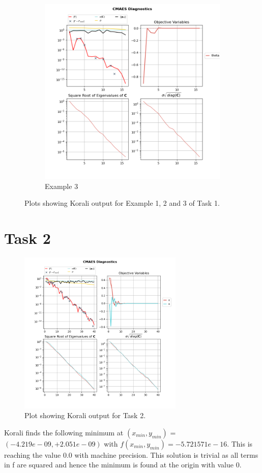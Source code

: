 \documentclass{article}
\begin{document}
\begin{figure}[ht]
\begin{subfigure}[b]{0.5\linewidth}
        \end{subfigure}
        \begin{subfigure}[b]{0.5\linewidth}
            \centering
            \includegraphics[width=0.95\linewidth]{img/example_1.png}
            \caption{Example 3}
        \end{subfigure}
        \caption{Plots showing Korali output for Example 1, 2 and 3 of Task 1.}
    \end{figure}

    \section{Task 2}
    \begin{figure}
        \centering
        \includegraphics[width=0.7\textwidth]{img/task2.png}
        \caption{Plot showing Korali output for Task 2.}
    \end{figure}
    Korali finds the following minimum at $(x_{min}, y_{min})$ = $(-4.219e-09, +2.051e-09)$ with $f(x_{min}, y_{min}) = -5.721571e-16$. This is reaching the value 0.0 with machine precision.
    This solution is trivial as all terms in f are squared and hence the minimum is found at the origin with value 0.
\end{document}
